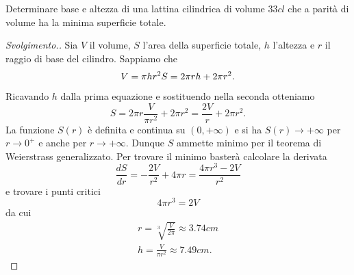 \begin{exercise}
%
%
Determinare base e altezza di una lattina cilindrica di volume $33 cl$
che a parità di volume ha la minima superficie totale.
\end{exercise}
\begin{proof}[Svolgimento.]
Sia $V$ il volume, $S$ l'area della superficie totale, $h$ l'altezza e $r$
il raggio di base del cilindro.
Sappiamo che
\[
  V = \pi h r^2 \\
  S = 2\pi r h + 2 \pi r^2.
\]
Ricavando $h$ dalla prima equazione e sostituendo nella seconda otteniamo
\[
  S = 2 \pi r \frac{V}{\pi r^2} + 2 \pi r^2
    = \frac{2V}{r} + 2 \pi r^2.
\]
La funzione $S(r)$ è definita e continua su $(0,+\infty)$
e si ha $S(r)\to +\infty$ per $r\to 0^+$
e anche per $r\to +\infty$. Dunque $S$ ammette minimo per il teorema di Weierstrass
generalizzato.
Per trovare il minimo basterà calcolare la derivata
\[
 \frac{dS}{dr} = -\frac{2V}{r^2} + 4 \pi r = \frac{4\pi r^3 - 2V}{r^2}
\]
e trovare i punti critici
\[
  4\pi r^3 = 2V
\]
da cui
\begin{align*}
 r = \sqrt[3]{\frac{V}{2\pi}} \approx 3.74 cm\\
 h = \frac{V}{\pi r^2} \approx 7.49 cm.
\end{align*}
\end{proof}

